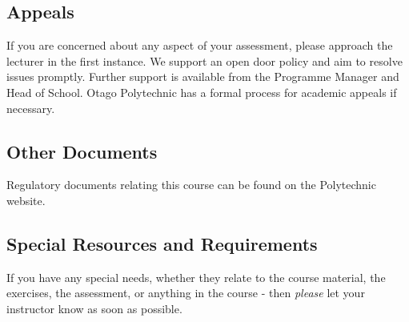 \documentclass{article}
\begin{document}
\subsection*{Appeals}
If you are concerned about any aspect of your assessment, please approach the lecturer in the first instance.  We support
an open door policy and aim to resolve issues promptly.  Further support is available from the Programme
Manager and Head of School. Otago Polytechnic has a formal process for academic appeals if necessary.

\subsection*{Other Documents}
Regulatory documents relating this course can be found on the Polytechnic website.




\subsection*{Special Resources and Requirements}
If you have any special needs, whether they relate to the course material, the exercises, the assessment, or anything in the course -
then \textit{please} let your instructor know as soon as possible.
\end{document}
